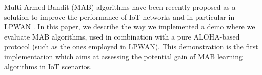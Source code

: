 Multi-Armed Bandit (MAB) algorithms have been recently proposed as a solution to improve the performance of IoT networks and in particular in LPWAN \cite{Bonnefoi18,Azari18}.
In this paper, we describe the way we implemented a demo where we evaluate MAB algorithms, used in combination with a pure ALOHA-based protocol (such as the ones employed in LPWAN).
%
%
This demonstration is the first implementation which aims at assessing the potential gain of MAB learning algorithms in IoT scenarios.
